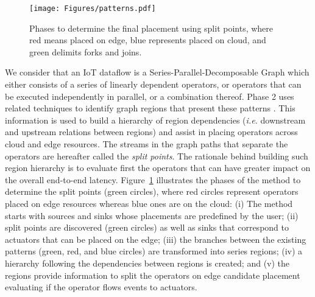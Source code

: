 \begin{figure} 
  \centering
  \texttt{[image: Figures/patterns.pdf]}
  \caption{Phases to determine the final placement using split points, where red means placed on edge, blue represents placed on cloud, and green delimits forks and joins.}
  \label{fig:graph}
\end{figure}

We consider that an IoT dataflow is a Series-Parallel-Decomposable Graph which either consists of a series of linearly dependent operators, or operators that can be executed independently in parallel, or a combination thereof. Phase 2 uses related techniques to identify graph regions that present these patterns \cite{Eidenbenz:2016}. This information is used to build a hierarchy of region dependencies (\textit{i.e.} downstream and upstream relations between regions) and assist in placing operators across cloud and edge resources. The streams in the graph paths that separate the operators are hereafter called the \textit{split points}. The rationale behind building such region hierarchy is to evaluate first the operators that can have greater impact on the overall end-to-end latency. Figure~\ref{fig:graph} illustrates the phases of the method to determine the split points (green circles), where red circles represent operators placed on edge resources whereas blue ones are on the cloud: (i) The method starts with sources and sinks whose placements are predefined by the user; (ii) split points are discovered (green circles) as well as sinks that correspond to actuators that can be placed on the edge; (iii) the branches between the existing patterns (green, red, and blue circles) are transformed into series regions; (iv) a hierarchy following the dependencies between regions is created; and (v) the regions provide information to split the operators on edge candidate placement evaluating if the operator flows events to actuators.

